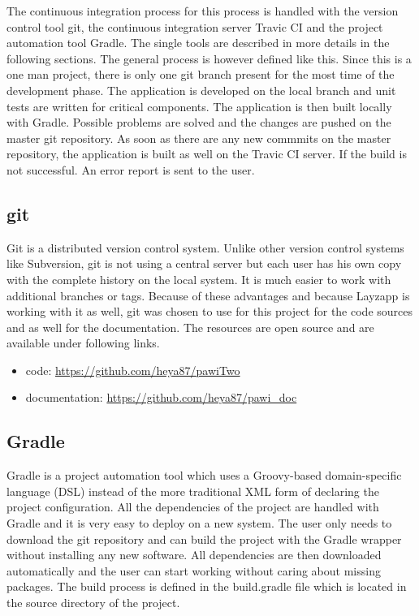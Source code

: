 The continuous integration process for this process is handled with the version control tool git, the continuous integration server Travic CI and the project automation tool Gradle. The single tools are described in more details in the following sections. The general process is however defined like this. Since this is a one man project, there is only one git branch present for the most time of the development phase. The application is developed on the local branch and unit tests are written for critical components. The application is then built locally with Gradle. Possible problems are solved and the changes are pushed on the master git repository. As soon as there are any new commmits on the master repository, the application is built as well on the Travic CI server. If the build is not successful. An error report is sent to the user.

\subsection{git}

Git is a distributed version control system. Unlike other version control systems like Subversion, git is not using a central server but each user has his own copy with the complete history on the local system. It is much easier to work with additional branches or tags. 
Because of these advantages and because Layzapp is working with it as well, git was chosen to use for this project for the code sources and as well for the documentation.
The resources are open source and are available under following links.

\begin{itemize}
\item code: \url{https://github.com/heya87/pawiTwo}
\item documentation: \url{https://github.com/heya87/pawi_doc}
\end{itemize}


\subsection{Gradle}

Gradle is a project automation tool which uses a Groovy-based domain-specific language (DSL) instead of the more traditional XML form of declaring the project configuration. All the dependencies of the project are handled with Gradle and it is very easy to deploy on a new system. The user only needs to download the git repository and can build the project with the Gradle wrapper without installing any new software. All dependencies are then downloaded automatically and the user can start working without caring about missing packages.
The build process is defined in the build.gradle file which is located in the source directory of the project. 

